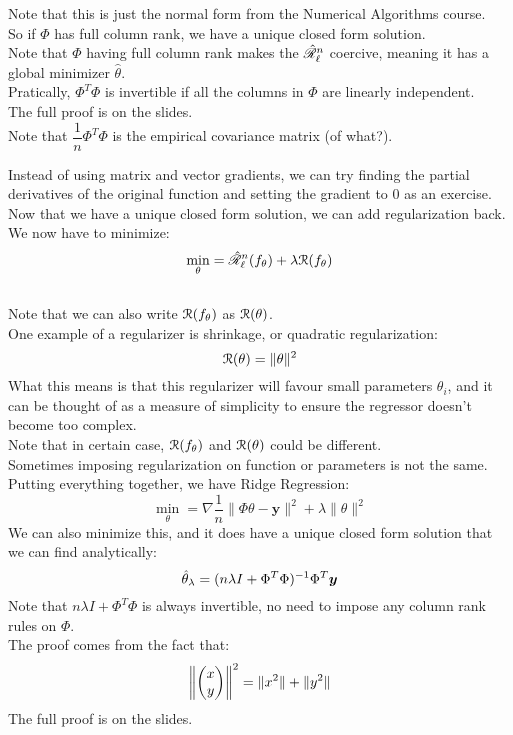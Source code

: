 \documentclass[12pt]{article}
\begin{document}
Note that this is just the normal form
from the Numerical Algorithms course. \\

So if $\Phi$ has full column rank,
we have a unique closed form solution. \\
Note that $\Phi$ having full column rank
makes the $\hat{\mathscr{R}}_{\ell}^{n}$
coercive, meaning it has a global minimizer
$\hat{\theta}$. \\
Pratically, $\Phi^T\Phi$ is invertible
if all the columns in $\Phi$
are linearly independent. \\
The full proof is on the slides. \\

Note that $\dfrac{1}{n}\Phi^T\Phi$ is the
empirical covariance matrix (of what?).

Instead of using matrix and vector gradients,
we can try finding the partial derivatives
of the original function and setting the gradient
to $0$ as an exercise. \\

Now that we have a unique closed form solution,
we can add regularization back. \\

We now have to minimize:
\[ \min_{\theta} = \hat{\mathscr{R}}_{\ell}^{n}(f_\theta)
+ \lambda \mathcal{R}(f_\theta) \] \\
Note that we can also write $\mathcal{R}(f_\theta)$
as $\mathcal{R}(\theta)$. \\

One example of a regularizer is shrinkage,
or quadratic regularization:
\[ \mathcal{R}(\theta) = \|\theta\|^2 \]
What this means is that this regularizer
will favour small parameters $\theta_i$,
and it can be thought of as a measure of
simplicity to ensure the regressor doesn't
become too complex. \\

Note that in certain case, $\mathcal{R}(f_\theta)$
and $\mathcal{R}(\theta)$ could be different. \\
Sometimes imposing regularization on function
or parameters is not the same. \\

Putting everything together, we have Ridge Regression:
\[ \min_{\theta} = \nabla \dfrac{1}{n}
\|\Phi \theta - \boldsymbol{y}\|^2 
+ \lambda \|\theta\|^2 \]
We can also minimize this,
and it does have a unique closed form solution that
we can find analytically:
\[ \hat{\theta}_\lambda = 
(n\lambda I + \Phi^T\Phi)^{-1} \Phi^T\boldsymbol{y} \]
Note that $n\lambda I + \Phi^T\Phi$ is always
invertible, no need to impose any column rank
rules on $\Phi$. \\
The proof comes from the fact that:
\[ \left\| \begin{pmatrix} x \\ y \end{pmatrix} \right\|^2 
= \|x^2\| + \|y^2\| \]
The full proof is on the slides. \\
\end{document}
